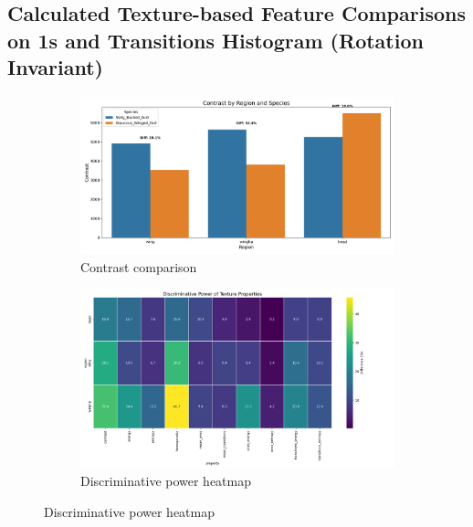 \documentclass[a4paper,12pt]{report}
\begin{document}
\subsection{Calculated Texture-based Feature Comparisons on 1s and Transitions Histogram (Rotation Invariant)}

\begin{figure}[H]
    \centering
    \begin{subfigure}[t]{0.48\textwidth}
        \centering
        \includegraphics[width=\textwidth]{images/appendix/Original/contrast_comparison.png}
        \caption{Contrast comparison}
    \end{subfigure}
    \hfill
    \begin{subfigure}[t]{0.48\textwidth}
        \centering
        \includegraphics[width=\textwidth]{images/appendix/Original/discriminative_power_heatmap.png}
        \caption{Discriminative power heatmap}
    \end{subfigure}
    
    \vspace{0.5cm}
    

\end{figure}
\end{document}

